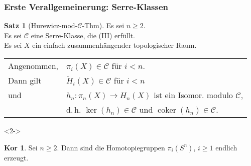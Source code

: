 \documentclass{beamer}
\newcommand{\SC}{\mathcal{C}} %
\DeclareMathOperator{\coker}{coker} %
\theoremstyle{definition}
\newtheorem*{satz}{Satz}
\newtheorem*{kor}{Kor} %
\begin{document}
\begin{frame}
  \frametitle{Erste Verallgemeinerung: Serre-Klassen}
  \begin{satz}[Hurewicz-mod-$\SC$-Thm] Es sei $n \geq 2$. \\
    Es sei $\SC$ eine Serre-Klasse, die (III) erfüllt. \\
    Es sei $X$ ein einfach zusammenhängender topologischer Raum. \\[0.5em]
    
    \begin{tabular}{l l}
      Angenommen, & $\pi_i(X) \in \SC$ \enspace für $i < n$. \\
      Dann gilt & $\widetilde{H}_i(X) \in \SC$ \enspace für $i < n$ \\
      und & $h_n : \pi_n(X) \to H_n(X)$ ist ein Isomor. modulo $\SC$, \\
      & d.\,h. $\ker(h_n) \in \SC$ und $\coker(h_n) \in \SC$.
    \end{tabular}
  \end{satz}
  
  \begin{visibleenv}<2->
    \begin{kor}
      Sei $n \geq 2$.
      Dann sind die Homotopiegruppen $\pi_i(S^n)$, $i \geq 1$ endlich erzeugt.
    \end{kor}
  \end{visibleenv}
\end{frame}
\end{document}
